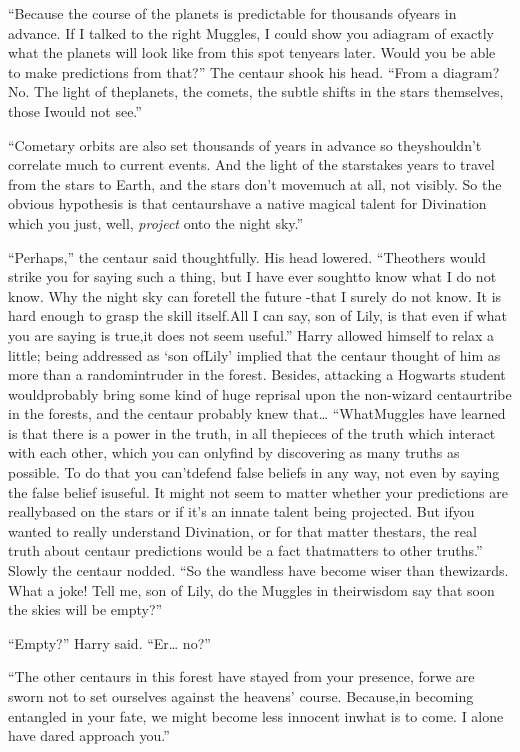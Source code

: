 ``Because the course of the planets is predictable for thousands ofyears in advance. If I talked to the right Muggles, I could show you adiagram of exactly what the planets will look like from this spot tenyears later. Would you be able to make predictions from that?''
The centaur shook his head. ``From a diagram? No. The light of theplanets, the comets, the subtle shifts in the stars themselves, those Iwould not see.''

``Cometary orbits are also set thousands of years in advance so theyshouldn't correlate much to current events. And the light of the starstakes years to travel from the stars to Earth, and the stars don't movemuch at all, not visibly. So the obvious hypothesis is that centaurshave a native magical talent for Divination which you just, well,
\emph{project} onto the night sky.''

``Perhaps,'' the centaur said thoughtfully. His head lowered. ``Theothers would strike you for saying such a thing, but I have ever soughtto know what I do not know. Why the night sky can foretell the future -that I surely do not know. It is hard enough to grasp the skill itself.All I can say, son of Lily, is that even if what you are saying is true,it does not seem useful.''
Harry allowed himself to relax a little; being addressed as `son ofLily' implied that the centaur thought of him as more than a randomintruder in the forest. Besides, attacking a Hogwarts student wouldprobably bring some kind of huge reprisal upon the non-wizard centaurtribe in the forests, and the centaur probably knew that\ldots{} ``WhatMuggles have learned is that there is a power in the truth, in all thepieces of the truth which interact with each other, which you can onlyfind by discovering as many truths as possible. To do that you can'tdefend false beliefs in any way, not even by saying the false belief isuseful. It might not seem to matter whether your predictions are reallybased on the stars or if it's an innate talent being projected. But ifyou wanted to really understand Divination, or for that matter thestars, the real truth about centaur predictions would be a fact thatmatters to other truths.''
Slowly the centaur nodded. ``So the wandless have become wiser than thewizards. What a joke! Tell me, son of Lily, do the Muggles in theirwisdom say that soon the skies will be empty?''

``Empty?'' Harry said. ``Er\ldots{} no?''

``The other centaurs in this forest have stayed from your presence, forwe are sworn not to set ourselves against the heavens' course. Because,in becoming entangled in your fate, we might become less innocent inwhat is to come. I alone have dared approach you.''

